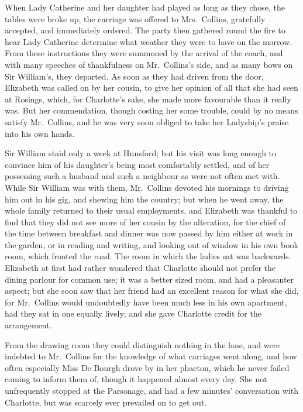 When Lady Catherine and her daughter had played as
long as they chose, the tables were broke up, the carriage
was offered to Mrs.\ Collins, gratefully accepted, and
immediately ordered. The party then gathered round the
fire to hear Lady Catherine determine what weather they
were to have on the morrow. From these instructions
they were summoned by the arrival of the coach, and
with many speeches of thankfulness on Mr.\ Collins’s side,
and as many bows on Sir William’s, they departed. As
soon as they had driven from the door, Elizabeth was
called on by her cousin, to give her opinion of all that she
had seen at Rosings, which, for Charlotte’s sake, she made
more favourable than it really was. But her commendation,
though costing her some trouble, could by no means
satisfy Mr.\ Collins, and he was very soon obliged to take
her Ladyship’s praise into his own hands.


Sir William staid only a week at Hunsford; but his
visit was long enough to convince him of his daughter’s
being most comfortably settled, and of her possessing such
a husband and such a neighbour as were not often met
with. While Sir William was with them, Mr.\ Collins
devoted his mornings to driving him out in his gig, and
shewing him the country; but when he went away, the
whole family returned to their usual employments, and
Elizabeth was thankful to find that they did not see more
of her cousin by the alteration, for the chief of the time
between breakfast and dinner was now passed by him
either at work in the garden, or in reading and writing, and
looking out of window in his own book room, which fronted
the road. The room in which the ladies sat was backwards.
Elizabeth at first had rather wondered that Charlotte should
not prefer the dining parlour for common use; it was
a better sized room, and had a pleasanter aspect; but
she soon saw that her friend had an excellent reason for
what she did, for Mr.\ Collins would undoubtedly have been
much less in his own apartment, had they sat in one
equally lively; and she gave Charlotte credit for the
arrangement.

From the drawing room they could distinguish nothing
in the lane, and were indebted to Mr.\ Collins for the
knowledge of what carriages went along, and how often
especially Miss De Bourgh drove by in her phaeton, which
he never failed coming to inform them of, though it happened
almost every day. She not unfrequently stopped
at the Parsonage, and had a few minutes’ conversation
with Charlotte, but was scarcely ever prevailed on to
get out.

